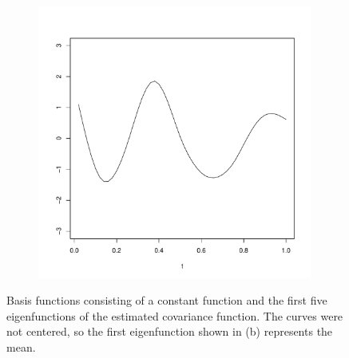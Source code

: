 \begin{figure}
\begin{subfigure}[b]{0.32\textwidth}
                \caption{}
                \label{}
        \end{subfigure}%
        \begin{subfigure}[b]{0.32\textwidth}
                \centering
                \includegraphics[width=0.99\textwidth]{Images-future-work/ef5.pdf}
                \caption{}
                \label{}
        \end{subfigure}
        \caption{Basis functions consisting of a constant function and the first five eigenfunctions of the estimated covariance function. The curves were not centered, so the first eigenfunction shown in (b) represents the mean.}
        \label{fig:basis functions}
\end{figure}

